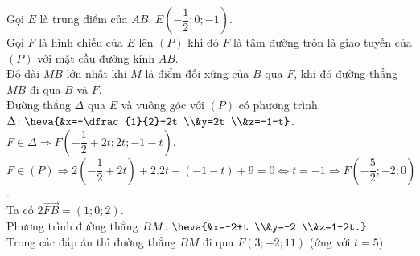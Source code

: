 \begin{ex}
{\begin{center}
\begin{tikzpicture}[>=stealth,line join=round,line cap=round,font=\footnotesize,scale=0.8]
			\end{tikzpicture}
		\end{center}
		Gọi $E$ là trung điểm của $AB$, $E\left( -\dfrac{1}{2};0;-1 \right)$.\\
		Gọi $F$ là hình chiếu của $E$ lên $(P)$ khi đó $F$ là tâm đường tròn là giao tuyến của $(P)$ với mặt cầu đường kính $AB$.\\
		Độ dài $MB$ lớn nhất khi $M$ là điểm đối xứng của $B$ qua $F$, khi đó đường thẳng $MB$ đi qua $B$ và $F$.\\
		Đường thẳng $\Delta $ qua $E$ và vuông góc với $(P)$ có phương trình $\Delta \colon \heva{&x=-\dfrac{1}{2}+2t \\&y=2t \\&z=-1-t}$.\\
		$F \in \Delta \Rightarrow F\left( -\dfrac12+2t;2t;-1-t \right)$.\\
		$F \in (P) \Rightarrow 2\left( -\dfrac{1}{2}+2t \right)+2.2t-\left( -1-t \right)+9=0\Leftrightarrow t=-1\Rightarrow F\left( -\dfrac{5}{2};-2;0 \right)$.\\
		Ta có $2\overrightarrow{FB}=\left( 1;0;2 \right)$.\\
		Phương trình đường thẳng $BM \colon \heva{&x=-2+t \\&y=-2 \\&z=1+2t.}$\\
		Trong các đáp án thì đường thẳng $BM$ đi qua $F\left( 3;-2;11 \right)$ (ứng với $t=5$).}
\end{ex}



